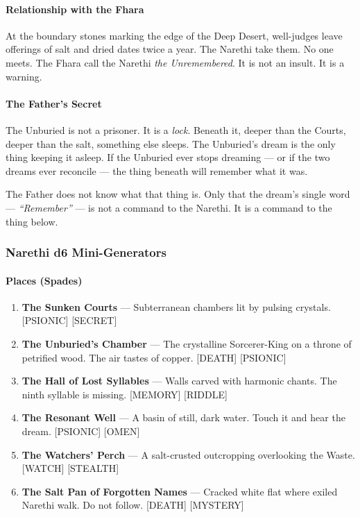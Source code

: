 \paragraph{Relationship with the Fhara}
At the boundary stones marking the edge of the Deep Desert, well-judges leave offerings of salt and dried dates twice a year. The Narethi take them. No one meets. The Fhara call the Narethi \textit{the Unremembered}. It is not an insult. It is a warning.

\paragraph{The Father's Secret}
The Unburied is not a prisoner. It is a \textit{lock}. Beneath it, deeper than the Courts, deeper than the salt, something else sleeps. The Unburied's dream is the only thing keeping it asleep. If the Unburied ever stops dreaming --- or if the two dreams ever reconcile --- the thing beneath will remember what it was.

The Father does not know what that thing is. Only that the dream's single word --- \textit{``Remember''} --- is not a command to the Narethi. It is a command to the thing below.

\clearpage
\subsubsection*{Narethi d6 Mini-Generators}

\paragraph{Places (Spades)}
\begin{enumerate}
    \item \textbf{The Sunken Courts} --- Subterranean chambers lit by pulsing crystals. [PSIONIC] [SECRET]
    \item \textbf{The Unburied's Chamber} --- The crystalline Sorcerer-King on a throne of petrified wood. The air tastes of copper. [DEATH] [PSIONIC]
    \item \textbf{The Hall of Lost Syllables} --- Walls carved with harmonic chants. The ninth syllable is missing. [MEMORY] [RIDDLE]
    \item \textbf{The Resonant Well} --- A basin of still, dark water. Touch it and hear the dream. [PSIONIC] [OMEN]
    \item \textbf{The Watchers' Perch} --- A salt-crusted outcropping overlooking the Waste. [WATCH] [STEALTH]
    \item \textbf{The Salt Pan of Forgotten Names} --- Cracked white flat where exiled Narethi walk. Do not follow. [DEATH] [MYSTERY]
\end{enumerate}

